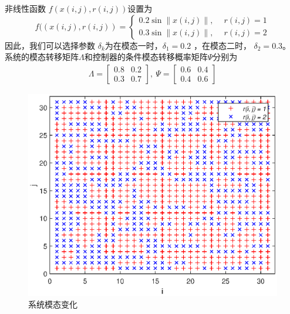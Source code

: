 	非线性函数 $f(x(i,j),r(i,j))$设置为
	\begin{equation*}
	f((x(i,j),r(i,j)) = \begin{cases}
	0.2\sin{ \|x(i,j)\|}, \quad \ r(i,j)=1\\
	0.3\sin{ \|x(i,j)\|}, \quad \ r(i,j)=2
	\end{cases}
	\end{equation*}
	因此，我们可以选择参数 $\delta_{k}$为在模态一时，$\delta_{1}=0.2$ ，在模态二时， $\delta_{2}=0.3$。\\
	系统的模态转移矩阵$\varLambda$和控制器的条件模态转移概率矩阵$\varPsi$分别为 
	\begin{equation*}
	\begin{aligned}
	\varLambda=\begin{bmatrix}
	0.8&0.2\\ 0.3&0.7
	\end{bmatrix}, \ 
	\varPsi = \begin{bmatrix}
	0.6&0.4\\ 0.4 &0.6
	\end{bmatrix}
	\end{aligned}
	\end{equation*}
	\begin{figure}[!htb]
		\centering\includegraphics[scale=0.6]{./figures/2dsmc/simulations/r_eps.eps}
		\caption{系统模态变化}
		\label{fig1}
	\end{figure}
